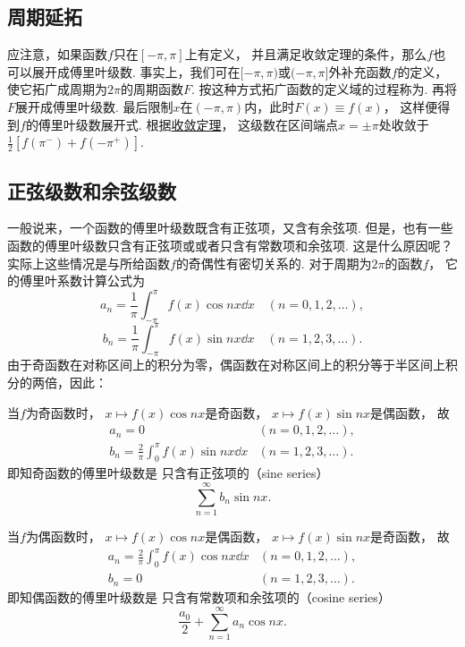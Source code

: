 \subsection{周期延拓}
应注意，如果函数\(f\)只在\([-\pi,\pi]\)上有定义，
并且满足收敛定理的条件，那么\(f\)也可以展开成傅里叶级数.
事实上，我们可在\([-\pi,\pi)\)或\((-\pi,\pi]\)外补充函数\(f\)的定义，
使它拓广成周期为\(2\pi\)的周期函数\(F\).
按这种方式拓广函数的定义域的过程称为.
再将\(F\)展开成傅里叶级数.
最后限制\(x\)在\((-\pi,\pi)\)内，此时\(F(x) \equiv f(x)\)，
这样便得到\(f\)的傅里叶级数展开式.
根据\hyperref[theorem:无穷级数.傅里叶级数收敛的狄利克雷充分条件]{收敛定理}，
这级数在区间端点\(x=\pm\pi\)处收敛于\(\frac{1}{2} [f(\pi^-) + f(-\pi^+)]\).

\subsection{正弦级数和余弦级数}
一般说来，一个函数的傅里叶级数既含有正弦项，又含有余弦项.
但是，也有一些函数的傅里叶级数只含有正弦项或或者只含有常数项和余弦项.
这是什么原因呢？实际上这些情况是与所给函数\(f\)的奇偶性有密切关系的.
对于周期为\(2\pi\)的函数\(f\)，
它的傅里叶系数计算公式为\[
	a_n = \frac{1}{\pi} \int_{-\pi}^\pi f(x) \cos nx \dd{x} \quad(n=0,1,2,\dotsc),
\]\[
	b_n = \frac{1}{\pi} \int_{-\pi}^\pi f(x) \sin nx \dd{x} \quad(n=1,2,3,\dotsc).
\]
由于奇函数在对称区间上的积分为零，偶函数在对称区间上的积分等于半区间上积分的两倍，因此：

当\(f\)为奇函数时，
\(x \mapsto f(x) \cos nx\)是奇函数，
\(x \mapsto f(x) \sin nx\)是偶函数，
故\[
	\begin{array}{ll}
		a_n = 0 & (n=0,1,2,\dotsc), \\
		b_n = \frac{2}{\pi} \int_0^\pi f(x) \sin nx \dd{x} & (n=1,2,3,\dotsc).
	\end{array}
\]
即知奇函数的傅里叶级数是
只含有正弦项的（sine series）\[
	\sum_{n=1}^\infty b_n \sin nx.
\]

当\(f\)为偶函数时，
\(x \mapsto f(x) \cos nx\)是偶函数，
\(x \mapsto f(x) \sin nx\)是奇函数，
故\[
	\begin{array}{ll}
		a_n = \frac{2}{\pi} \int_0^\pi f(x) \cos nx \dd{x} & (n=0,1,2,\dotsc), \\
		b_n = 0 & (n=1,2,3,\dotsc).
	\end{array}
\]
即知偶函数的傅里叶级数是
只含有常数项和余弦项的（cosine series）\[
	\frac{a_0}{2} + \sum_{n=1}^\infty a_n \cos{nx}.
\]

